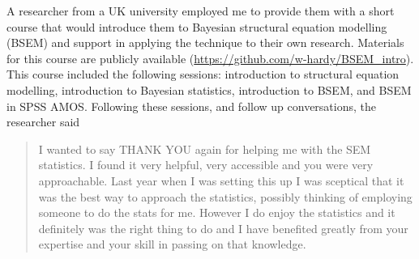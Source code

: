 \documentclass[
  12pt,
  a4paper,
]{book}
\begin{document}
A researcher from a UK university employed me to provide them with a short course that would introduce them to Bayesian structural equation modelling (BSEM) and support in applying the technique to their own research. Materials for this course are publicly available (\url{https://github.com/w-hardy/BSEM_intro}). This course included the following sessions: introduction to structural equation modelling, introduction to Bayesian statistics, introduction to BSEM, and BSEM in SPSS AMOS. Following these sessions, and follow up conversations, the researcher said

\begin{quote}
I wanted to say THANK YOU again for helping me with the SEM statistics. I found it very helpful, very accessible and you were very approachable. Last year when I was setting this up I was sceptical that it was the best way to approach the statistics, possibly thinking of employing someone to do the stats for me. However I do enjoy the statistics and it definitely was the right thing to do and I have benefited greatly from your expertise and your skill in passing on that knowledge.
\end{quote}

\renewcommand\bibname{References}
  

\end{document}
